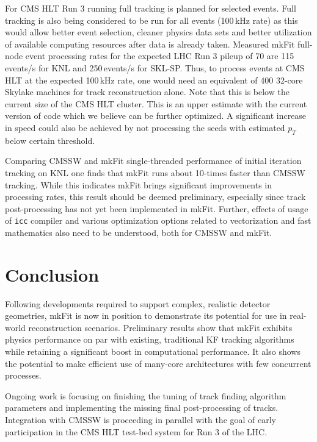 \documentclass{webofc}
\def\mkfit{mkFit\xspace}
\def\stt#1{{\small\texttt{#1}}}
\begin{document}
For CMS HLT Run 3 running full tracking is planned for selected events. Full
tracking is also being considered to be run for all events (100\,kHz rate) as
this would allow better event selection, cleaner physics data sets and better
utilization of available computing resources after data is already taken.
Measured \mkfit full-node event processing rates for the expected LHC Run 3 pileup of 70
are 115\,events/s for KNL and 250\,events/s for SKL-SP. Thus, to process events
at CMS HLT at the expected 100\,kHz rate, one would need an equivalent of 400
32-core Skylake machines for track reconstruction alone. Note that this is below
the current size of the CMS HLT cluster. This is an upper
estimate with the current version of code which we believe can be further
optimized. A significant increase in speed could also be achieved by not
processing the seeds with estimated $p_T$ below certain threshold.

Comparing CMSSW and \mkfit single-threaded performance of initial iteration tracking
on KNL one finds that \mkfit runs about 10-times faster than CMSSW tracking.
While this indicates \mkfit brings
significant improvements in processing rates, this result should be deemed
preliminary, especially since track post-processing has not yet been
implemented in \mkfit. Further, effects of usage of \stt{icc} compiler and 
various optimization options related to vectorization and fast mathematics 
also need to be understood, both for CMSSW and \mkfit.


\section{Conclusion}

Following developments required to support complex, realistic detector
geometries, \mkfit is now in position to demonstrate its potential for use in
real-world reconstruction scenarios. Preliminary results show that \mkfit
exhibits physics performance on par with existing, traditional KF tracking
algorithms while retaining a significant boost in computational
performance. It also shows the potential to make efficient use of many-core
architectures with few concurrent processes.

Ongoing work is focusing on finishing the tuning of track finding algorithm
parameters and implementing the missing final post-processing of
tracks. Integration with CMSSW is proceeding in parallel with the goal of
early participation in the CMS HLT test-bed system for Run 3 of the LHC.
\end{document}
